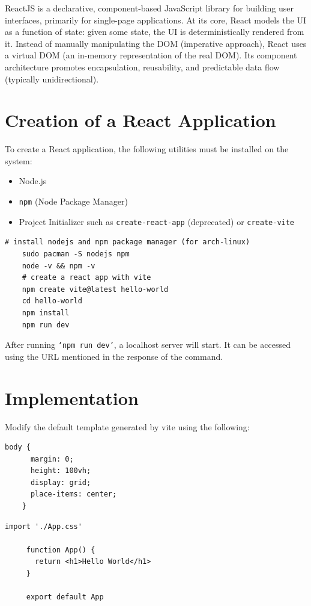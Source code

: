 \documentclass[12pt, a4paper]{report}
\begin{document}
    ReactJS is a declarative, component-based JavaScript library for building user interfaces, primarily for single-page applications. At its core, React models the UI as a function of state: given some state, the UI is deterministically rendered from it. Instead of manually manipulating the DOM (imperative approach), React uses a virtual DOM (an in-memory representation of the real DOM). Its component architecture promotes encapsulation, reusability, and predictable data flow (typically unidirectional).

    \section{Creation of a React Application}
    To create a React application, the following utilities must be installed on the system:
    \begin{itemize}
    \item Node.js
    \item \texttt{npm} (Node Package Manager)
    \item Project Initializer such as \texttt{create-react-app} (deprecated) or \texttt{create-vite}
    \end{itemize}

    \begin{lstlisting}[caption=Installing the prerequisites and creating a React application]
    # install nodejs and npm package manager (for arch-linux)
    sudo pacman -S nodejs npm
    node -v && npm -v
    # create a react app with vite
    npm create vite@latest hello-world
    cd hello-world
    npm install
    npm run dev
    \end{lstlisting}
    After running \texttt{`npm run dev'}, a localhost server will start. It can be accessed using the URL mentioned in the response of the command.

    \section{Implementation}
    Modify the default template generated by vite using the following:
    \begin{lstlisting}[caption={\texttt{App.css}}]
    body {
      margin: 0;
      height: 100vh;
      display: grid;
      place-items: center;
    }
    \end{lstlisting}

    \begin{lstlisting}[caption={\texttt{App.jsx}}]
     import './App.css'

     function App() {
       return <h1>Hello World</h1>
     }

     export default App
     \end{lstlisting}
\end{document}
